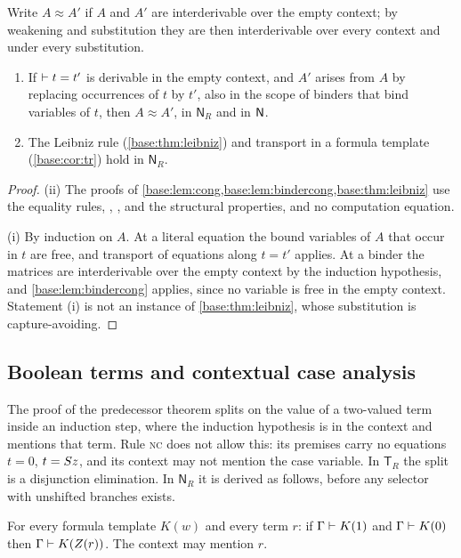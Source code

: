 \begin{lemma}[Replacement]\label{seed:lem:succ-leibniz}
Write $A\approx A'$ if $A$ and $A'$ are interderivable over the empty
context; by weakening and substitution they are then interderivable over
every context and under every substitution.
\begin{enumerate}[label=(\roman*),nosep]
\item If $\vdash t=t'$ is derivable in the empty context, and $A'$ arises
from $A$ by replacing occurrences of $t$ by $t'$, also in the scope of binders
that bind variables of $t$, then $A\approx A'$, in $\mathsf{N}_R$ and in
$\mathsf{N}$.
\item The Leibniz rule (\cref{base:thm:leibniz}) and transport in a formula
template (\cref{base:cor:tr}) hold in $\mathsf{N}_R$.
\end{enumerate}
\end{lemma}

\begin{proof}
(ii) The proofs of \cref{base:lem:cong,base:lem:bindercong,base:thm:leibniz}
use the equality rules, , ,  and the
structural properties, and no computation equation.

(i) By induction on $A$. At a literal equation the bound variables of $A$
that occur in $t$ are free, and transport of equations along $t=t'$ applies.
At a binder the matrices are interderivable over the empty context by the
induction hypothesis, and \cref{base:lem:bindercong} applies, since no
variable is free in the empty context. Statement (i) is not an instance of
\cref{base:thm:leibniz}, whose substitution is capture-avoiding.
\end{proof}

\subsection{Boolean terms and contextual case analysis}

The proof of the predecessor theorem splits on the value of a two-valued term
inside an induction step, where the induction hypothesis is in the context and
mentions that term. Rule \textsc{nc} does not allow this: its premises carry no
equations $t=0$, $t=S z$, and its context may not mention the case
variable. In $\mathsf{T}_R$ the split is a disjunction elimination. In
$\mathsf{N}_R$ it is derived as follows, before any selector with unshifted
branches exists.

\begin{lemma}\label{seed:lem:succ-range}
For every formula template $K(w)$ and every term $r$: if
$\Gamma\vdash K(1)$ and $\Gamma\vdash K(0)$ then
$\Gamma\vdash K(Z(r))$. The context may mention $r$.
\end{lemma}

